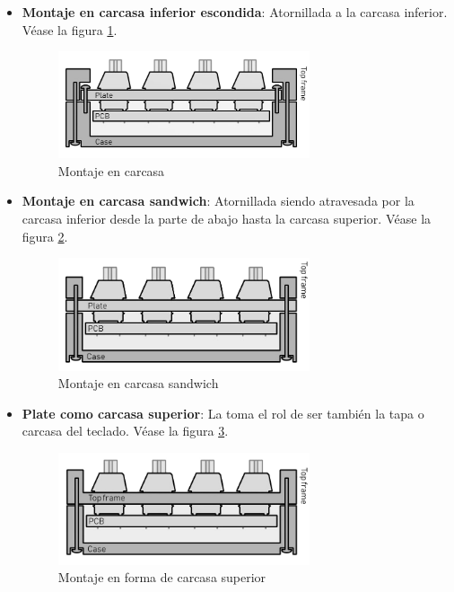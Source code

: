 \begin{itemize}
    \item \textbf{Montaje en carcasa inferior escondida}: Atornillada a la carcasa inferior. Véase  la figura \ref{fig:Montaje3}.
    \begin{figure}[H]
        \centering
        \includegraphics[width=0.7\textwidth]{imagenes/Capitulos/Cap03/Montajes/Montaje3.png}
        \caption{Montaje en carcasa \cite{Keyboards-Mounting-Styles}}
        \label{fig:Montaje3}
    \end{figure}
    
    \item \textbf{Montaje en carcasa sandwich}: Atornillada siendo atravesada por la carcasa inferior desde la parte de abajo hasta la carcasa superior. Véase  la figura \ref{fig:Montaje4}.
    \begin{figure}[H]
        \centering
        \includegraphics[width=0.7\textwidth]{imagenes/Capitulos/Cap03/Montajes/Montaje4.png}
        \caption{Montaje en carcasa sandwich \cite{Keyboards-Mounting-Styles}}
        \label{fig:Montaje4}
    \end{figure}
    
    \item \textbf{\gls{Plate} como carcasa superior}: La  toma el rol de ser también la tapa o carcasa del teclado. Véase  la figura \ref{fig:Montaje5}.
    \begin{figure}[H]
        \centering
        \includegraphics[width=0.7\textwidth]{imagenes/Capitulos/Cap03/Montajes/Montaje5.png}
        \caption{Montaje en forma de carcasa superior \cite{Keyboards-Mounting-Styles}}
        \label{fig:Montaje5}
    \end{figure}
    

\end{itemize}
